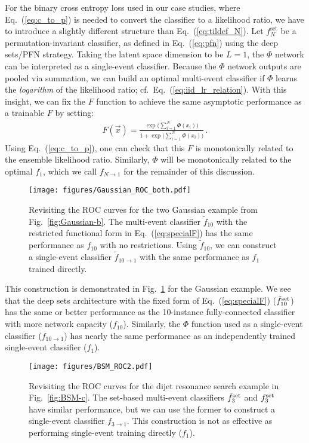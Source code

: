\documentclass[aps,prx,reprint,preprintnumbers,superscriptaddress,nofootinbib,longbibliography,floatfix]{revtex4-2}
\DeclareRobustCommand{\Fig}[1]{Fig.~\ref{fig:#1}}
\DeclareRobustCommand{\Eq}[1]{Eq.~(\ref{eq:#1})}
\begin{document}
For the binary cross entropy loss used in our case studies, where \Eq{c_to_p} is needed to convert the classifier to a likelihood ratio, we have to introduce a slightly different structure than \Eq{tildef_N}.
%
Let $f_N^\text{set}$ be a permutation-invariant classifier, as defined in \Eq{pfn} using the deep sets/PFN strategy.
%
Taking the latent space dimension to be $L=1$, the $\Phi$ network can be interpreted as a single-event classifier.
%
Because the $\Phi$ network outputs are pooled via summation, we can build an optimal multi-event classifier if $\Phi$ learns the \emph{logarithm} of the likelihood ratio; cf.\ \Eq{iid_lr_relation}.
%
With this insight, we can fix the $F$ function to achieve the same asymptotic performance as a trainable $F$ by setting:
%
\begin{align}
\label{eq:specialF}
    F(\vec{x}) = \frac{\exp\big(\sum_{i = 1}^N \Phi(x_i)\big)}{1+\exp\big(\sum_{i = 1}^N \Phi(x_i)\big)}\,.
\end{align}
%
Using \Eq{c_to_p}, one can check that this $F$ is monotonically related to the ensemble likelihood ratio.
%
Similarly, $\Phi$ will be monotonically related to the optimal $f_1$, which we call $f_{N \to 1}$ for the remainder of this discussion.  


 \begin{figure}[t]
 \centering
 \texttt{[image: figures/Gaussian\_ROC\_both.pdf]}
 \caption{Revisiting the ROC curves for the two Gaussian example from \Fig{Gaussian-b}.
 The multi-event classifier $\tilde{f}_{10}$ with the restricted functional form in \Eq{specialF} has the same performance as $f_{10}$ with no restrictions.
 Using $\tilde{f}_{10}$, we can construct a single-event classifier $\tilde{f}_{10 \to 1}$ with the same performance as $f_1$ trained directly.}
 \label{fig:Gaussian2}
 \end{figure}

This construction is demonstrated in \Fig{Gaussian2} for the Gaussian example.
%
We see that the deep sets architecture with the fixed form of \Eq{specialF} ($\tilde{f}^{\rm set}_{10}$) has the same or better performance as the 10-instance fully-connected classifier with more network capacity ($f_{10}$).
%
Similarly, the $\Phi$ function used as a single-event classifier ($f_{10\rightarrow 1}$)  has nearly the same performance as an independently trained single-event classifier ($f_1$).


 \begin{figure}[t]
 \centering
 \texttt{[image: figures/BSM\_ROC2.pdf]}
 \caption{Revisiting the ROC curves for the dijet resonance search example in \Fig{BSM-c}.
The set-based multi-event classifiers $\tilde{f}_3^{\rm set}$ and $f_3^{\rm set}$ have similar performance, but we can use the former to construct a single-event classifier $f_{3 \to 1}$.
%
This construction is not as effective as performing single-event training directly ($f_1$).
}
 \label{fig:BSM2}
 \end{figure}
\end{document}
